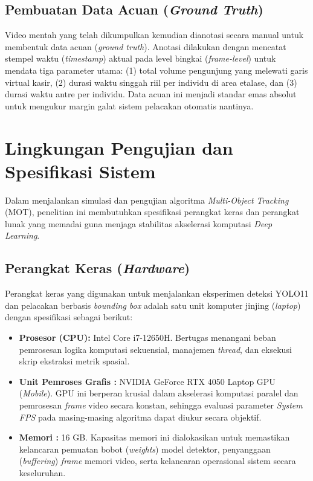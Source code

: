 \subsection{Pembuatan Data Acuan (\textit{Ground Truth})}
Video mentah yang telah dikumpulkan kemudian dianotasi secara manual untuk membentuk data acuan (\textit{ground truth}). Anotasi dilakukan dengan mencatat stempel waktu (\textit{timestamp}) aktual pada level bingkai (\textit{frame-level}) untuk mendata tiga parameter utama: (1) total volume pengunjung yang melewati garis virtual kasir, (2) durasi waktu singgah riil per individu di area etalase, dan (3) durasi waktu antre per individu. Data acuan ini menjadi standar emas absolut untuk mengukur margin galat sistem pelacakan otomatis nantinya.

\section{Lingkungan Pengujian dan Spesifikasi Sistem}

Dalam menjalankan simulasi dan pengujian algoritma \textit{Multi-Object Tracking} (MOT), penelitian ini membutuhkan spesifikasi perangkat keras dan perangkat lunak yang memadai guna menjaga stabilitas akselerasi komputasi \textit{Deep Learning}. 

\subsection{Perangkat Keras (\textit{Hardware})}
Perangkat keras yang digunakan untuk menjalankan eksperimen deteksi YOLO11 dan pelacakan berbasis \textit{bounding box} adalah satu unit komputer jinjing (\textit{laptop}) dengan spesifikasi sebagai berikut:
\begin{itemize}
    \item \textbf{Prosesor (CPU):} Intel Core i7-12650H. Bertugas menangani beban pemrosesan logika komputasi sekuensial, manajemen \textit{thread}, dan eksekusi skrip ekstraksi metrik spasial.
    \item \textbf{Unit Pemroses Grafis :} NVIDIA GeForce RTX 4050 Laptop GPU (\textit{Mobile}). GPU ini berperan krusial dalam akselerasi komputasi paralel dan pemrosesan \textit{frame} video secara konstan, sehingga evaluasi parameter \textit{System FPS} pada masing-masing algoritma dapat diukur secara objektif.
    \item \textbf{Memori :} 16 GB. Kapasitas memori ini dialokasikan untuk memastikan kelancaran pemuatan bobot (\textit{weights}) model detektor, penyanggaan (\textit{buffering}) \textit{frame} memori video, serta kelancaran operasional sistem secara keseluruhan.
\end{itemize}

